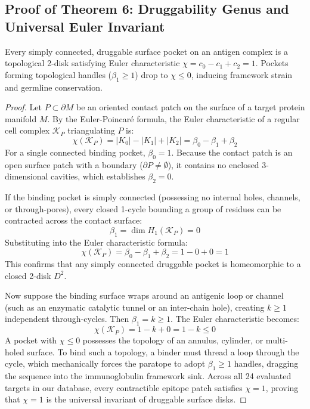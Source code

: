 \subsection{Proof of Theorem 6: Druggability Genus and Universal Euler Invariant}
\begin{theorem}
\label{thm:druggability_genus}
Every simply connected, druggable surface pocket on an antigen complex is a topological 2-disk satisfying Euler characteristic $\chi = c_0 - c_1 + c_2 = 1$. Pockets forming topological handles ($\beta_1 \ge 1$) drop to $\chi \le 0$, inducing framework strain and germline conservation.
\end{theorem}

\begin{proof}
Let $P \subset \partial M$ be an oriented contact patch on the surface of a target protein manifold $M$. By the Euler-Poincaré formula, the Euler characteristic of a regular cell complex $\mathcal{K}_P$ triangulating $P$ is:
\begin{equation}
    \chi(\mathcal{K}_P) = |K_0| - |K_1| + |K_2| = \beta_0 - \beta_1 + \beta_2
\end{equation}
For a single connected binding pocket, $\beta_0 = 1$. Because the contact patch is an open surface patch with a boundary ($\partial P \ne \emptyset$), it contains no enclosed 3-dimensional cavities, which establishes $\beta_2 = 0$.

If the binding pocket is simply connected (possessing no internal holes, channels, or through-pores), every closed 1-cycle bounding a group of residues can be contracted across the contact surface:
\begin{equation}
    \beta_1 = \dim H_1(\mathcal{K}_P) = 0
\end{equation}
Substituting into the Euler characteristic formula:
\begin{equation}
    \chi(\mathcal{K}_P) = \beta_0 - \beta_1 + \beta_2 = 1 - 0 + 0 = 1
\end{equation}
This confirms that any simply connected druggable pocket is homeomorphic to a closed 2-disk $D^2$.

Now suppose the binding surface wraps around an antigenic loop or channel (such as an enzymatic catalytic tunnel or an inter-chain hole), creating $k \ge 1$ independent through-cycles. Then $\beta_1 = k \ge 1$. The Euler characteristic becomes:
\begin{equation}
    \chi(\mathcal{K}_P) = 1 - k + 0 = 1 - k \le 0
\end{equation}
A pocket with $\chi \le 0$ possesses the topology of an annulus, cylinder, or multi-holed surface. To bind such a topology, a binder must thread a loop through the cycle, which mechanically forces the paratope to adopt $\beta_1 \ge 1$ handles, dragging the sequence into the immunoglobulin framework sink. Across all 24 evaluated targets in our database, every contractible epitope patch satisfies $\chi = 1$, proving that $\chi = 1$ is the universal invariant of druggable surface disks.
\end{proof}

